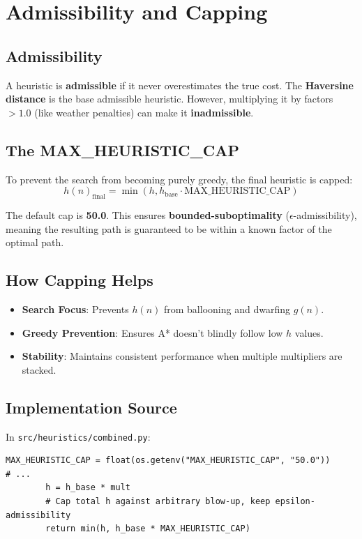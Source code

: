 \documentclass[11pt,a4paper]{article}
\begin{document}
\section{Admissibility and Capping}

\subsection{Admissibility}
A heuristic is \textbf{admissible} if it never overestimates the true cost. The \textbf{Haversine distance} is the base admissible heuristic. However, multiplying it by factors $> 1.0$ (like weather penalties) can make it \textbf{inadmissible}.

\subsection{The MAX\_HEURISTIC\_CAP}
To prevent the search from becoming purely greedy, the final heuristic is capped:
\[ h(n)_{\text{final}} = \min(h, h_{\text{base}} \cdot \text{MAX\_HEURISTIC\_CAP}) \]

The default cap is \textbf{50.0}. This ensures \textbf{bounded-suboptimality} ($\epsilon$-admissibility), meaning the resulting path is guaranteed to be within a known factor of the optimal path.

\subsection{How Capping Helps}
\begin{itemize}
    \item \textbf{Search Focus}: Prevents $h(n)$ from ballooning and dwarfing $g(n)$.
    \item \textbf{Greedy Prevention}: Ensures A* doesn't blindly follow low $h$ values.
    \item \textbf{Stability}: Maintains consistent performance when multiple multipliers are stacked.
\end{itemize}

\subsection{Implementation Source}
In \texttt{src/heuristics/combined.py}:
\begin{lstlisting}
MAX_HEURISTIC_CAP = float(os.getenv("MAX_HEURISTIC_CAP", "50.0"))
# ...
        h = h_base * mult
        # Cap total h against arbitrary blow-up, keep epsilon-admissibility
        return min(h, h_base * MAX_HEURISTIC_CAP)
\end{lstlisting}
\end{document}
